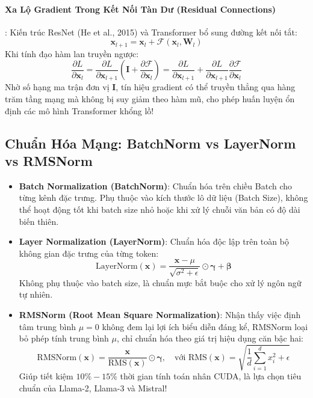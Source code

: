 \paragraph{Xa Lộ Gradient Trong Kết Nối Tàn Dư (Residual Connections)}:
Kiến trúc ResNet (He et al., 2015) và Transformer bổ sung đường kết nối tắt:
\begin{equation}
\mathbf{x}_{l+1} = \mathbf{x}_l + \mathcal{F}(\mathbf{x}_l, \mathbf{W}_l)
\end{equation}
Khi tính đạo hàm lan truyền ngược:
\begin{equation}
\frac{\partial L}{\partial \mathbf{x}_l} = \frac{\partial L}{\partial \mathbf{x}_{l+1}} \left( \mathbf{I} + \frac{\partial \mathcal{F}}{\partial \mathbf{x}_l} \right) = \frac{\partial L}{\partial \mathbf{x}_{l+1}} + \frac{\partial L}{\partial \mathbf{x}_{l+1}} \frac{\partial \mathcal{F}}{\partial \mathbf{x}_l}
\end{equation}
Nhờ số hạng ma trận đơn vị $\mathbf{I}$, tín hiệu gradient có thể truyền thẳng qua hàng trăm tầng mạng mà không bị suy giảm theo hàm mũ, cho phép huấn luyện ổn định các mô hình Transformer khổng lồ!

\subsection{Chuẩn Hóa Mạng: BatchNorm vs LayerNorm vs RMSNorm}
\begin{itemize}
  \item \textbf{Batch Normalization (BatchNorm)}: Chuẩn hóa trên chiều Batch cho từng kênh đặc trưng. Phụ thuộc vào kích thước lô dữ liệu (Batch Size), không thể hoạt động tốt khi batch size nhỏ hoặc khi xử lý chuỗi văn bản có độ dài biến thiên.
  \item \textbf{Layer Normalization (LayerNorm)}: Chuẩn hóa độc lập trên toàn bộ không gian đặc trưng của từng token:
  \begin{equation}
  \text{LayerNorm}(\mathbf{x}) = \frac{\mathbf{x} - \mu}{\sqrt{\sigma^2 + \epsilon}} \odot \boldsymbol{\gamma} + \boldsymbol{\beta}
  \end{equation}
  Không phụ thuộc vào batch size, là chuẩn mực bắt buộc cho xử lý ngôn ngữ tự nhiên.
  \item \textbf{RMSNorm (Root Mean Square Normalization)}: Nhận thấy việc định tâm trung bình $\mu=0$ không đem lại lợi ích biểu diễn đáng kể, RMSNorm loại bỏ phép tính trung bình $\mu$, chỉ chuẩn hóa theo giá trị hiệu dụng căn bậc hai:
  \begin{equation}
  \text{RMSNorm}(\mathbf{x}) = \frac{\mathbf{x}}{\text{RMS}(\mathbf{x})} \odot \boldsymbol{\gamma}, \quad \text{với } \text{RMS}(\mathbf{x}) = \sqrt{\frac{1}{d} \sum_{i=1}^d x_i^2 + \epsilon}
  \end{equation}
  Giúp tiết kiệm $10\% - 15\%$ thời gian tính toán nhân CUDA, là lựa chọn tiêu chuẩn của Llama-2, Llama-3 và Mistral!
\end{itemize}

